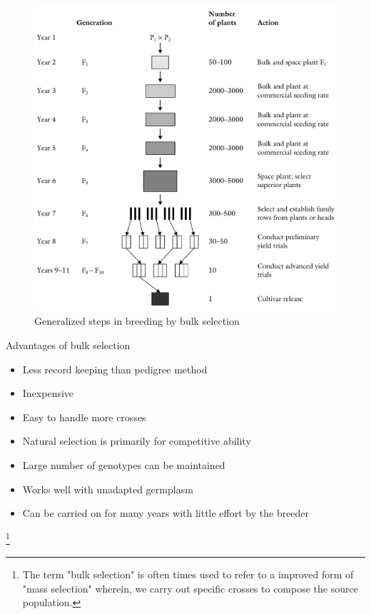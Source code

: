 \documentclass[11pt,ignorenonframetext,aspectratio=169]{beamer}
\providecommand{\tightlist}{%
  \setlength{\itemsep}{0pt}\setlength{\parskip}{0pt}}
\begin{document}
\begin{frame}{}
\protect\hypertarget{section-13}{}
\begin{figure}

{\centering \includegraphics[width=0.56\linewidth]{./images/bulk_selection} 

}

\caption{Generalized steps in breeding by bulk selection}\label{fig:bulk-selection}
\end{figure}
\end{frame}

\begin{frame}{Advantages of bulk selection}
\protect\hypertarget{advantages-of-bulk-selection}{}
\begin{itemize}
\tightlist
\item
  Less record keeping than pedigree method
\item
  Inexpensive
\item
  Easy to handle more crosses
\item
  Natural selection is primarily for competitive ability
\item
  Large number of genotypes can be maintained
\item
  Works well with unadapted germplasm
\item
  Can be carried on for many years with little effort by the breeder
\end{itemize}

\footnote[frame]{\scriptsize The term "bulk selection" is often times used to refer to a improved form of "mass selection" wherein, we carry out specific crosses to compose the source population.}
\end{frame}
\end{document}
